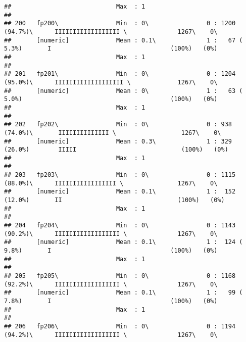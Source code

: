 \documentclass[]{article}
\begin{document}
\begin{verbatim}
##                             Max  : 1                                                                                            
## 
## 200   fp200\                Min  : 0\                0 : 1200 (94.7%)\      IIIIIIIIIIIIIIIIII \              1267\    0\       
##       [numeric]             Mean : 0.1\              1 :   67 ( 5.3%)       I                                 (100%)   (0%)     
##                             Max  : 1                                                                                            
## 
## 201   fp201\                Min  : 0\                0 : 1204 (95.0%)\      IIIIIIIIIIIIIIIIIII \             1267\    0\       
##       [numeric]             Mean : 0\                1 :   63 ( 5.0%)                                         (100%)   (0%)     
##                             Max  : 1                                                                                            
## 
## 202   fp202\                Min  : 0\                0 : 938 (74.0%)\       IIIIIIIIIIIIII \                  1267\    0\       
##       [numeric]             Mean : 0.3\              1 : 329 (26.0%)        IIIII                             (100%)   (0%)     
##                             Max  : 1                                                                                            
## 
## 203   fp203\                Min  : 0\                0 : 1115 (88.0%)\      IIIIIIIIIIIIIIIII \               1267\    0\       
##       [numeric]             Mean : 0.1\              1 :  152 (12.0%)       II                                (100%)   (0%)     
##                             Max  : 1                                                                                            
## 
## 204   fp204\                Min  : 0\                0 : 1143 (90.2%)\      IIIIIIIIIIIIIIIIII \              1267\    0\       
##       [numeric]             Mean : 0.1\              1 :  124 ( 9.8%)       I                                 (100%)   (0%)     
##                             Max  : 1                                                                                            
## 
## 205   fp205\                Min  : 0\                0 : 1168 (92.2%)\      IIIIIIIIIIIIIIIIII \              1267\    0\       
##       [numeric]             Mean : 0.1\              1 :   99 ( 7.8%)       I                                 (100%)   (0%)     
##                             Max  : 1                                                                                            
## 
## 206   fp206\                Min  : 0\                0 : 1194 (94.2%)\      IIIIIIIIIIIIIIIIII \              1267\    0\       

\end{verbatim}
\end{document}

